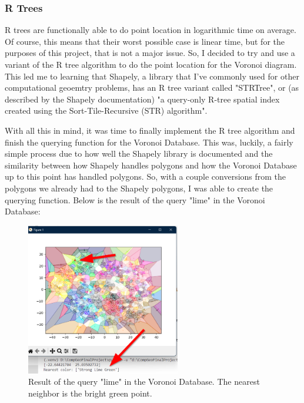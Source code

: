 \documentclass{article}
\begin{document}
\subsubsection{R Trees}
R trees are functionally able to do point location in logarithmic time on average.
Of course, this means that their worst possible case is linear time, but for the purposes
of this project, that is not a major issue. So, I decided to try and use a variant of the 
R tree algorithm to do the point location for the Voronoi diagram. This led me to learning
that Shapely, a library that I've commonly used for other computational geoemtry problems,
has an R tree variant called "STRTree", or (as described by the Shapely documentation) 
"a query-only R-tree spatial index created using the Sort-Tile-Recursive (STR) algorithm"\cite{shapelySTRTree}\cite{strAlgorithm}.
\newline

\noindent
With all this in mind, it was time to finally implement the R tree algorithm and finish
the querying function for the Voronoi Database. This was, luckily, a fairly simple process
due to how well the Shapely library is documented and the similarity between how Shapely
handles polygons and how the Voronoi Database up to this point has handled polygons. So,
with a couple conversions from the polygons we already had to the Shapely polygons, I was
able to create the querying function. Below is the result of the query "lime" in the Voronoi
Database:

\begin{figure}[H]
\centering
\includegraphics[width=0.6\textwidth]{images/full_query_image.png}
\caption{Result of the query "lime" in the Voronoi Database. The nearest neighbor is the bright green point.}
\label{fig:queryresult}
\end{figure}
\end{document}
